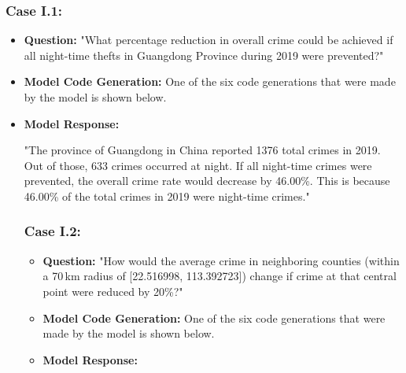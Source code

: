 \subsubsection{Case I.1:}
\begin{itemize}
    \item \textbf{Question:} "What percentage reduction in overall crime could be achieved if all night-time thefts in Guangdong Province during 2019 were prevented?"
    \item \textbf{Model Code Generation:} One of the six code generations that were made by the model is shown below. 

    



    \item \textbf{Model Response:} 
    
    \begin{tcolorbox}[colback=white!95!black, colframe=black, title=Q1 Response, fontupper=\scriptsize]

    "The province of Guangdong in China reported 1376 total crimes in 2019. Out of those, 633 crimes occurred at night. If all night-time crimes were prevented, the overall crime rate would decrease by 46.00\%. This is because 46.00\% of the total crimes in 2019 were night-time crimes."
    \end{tcolorbox}

\subsubsection{Case I.2:}
\begin{itemize}
    \item \textbf{Question:} "How would the average crime in neighboring counties (within a 70 km radius of [22.516998, 113.392723]) change if crime at that central point were reduced by 20\%?"
    \item \textbf{Model Code Generation:} One of the six code generations that were made by the model is shown below. 


    

  \item \textbf{Model Response:} 
    

    \begin{tcolorbox}[colback=white!95!black, colframe=black, title=Q2 Response, fontupper=\scriptsize]
    

\end{tcolorbox}
\end{itemize}
\end{itemize}

